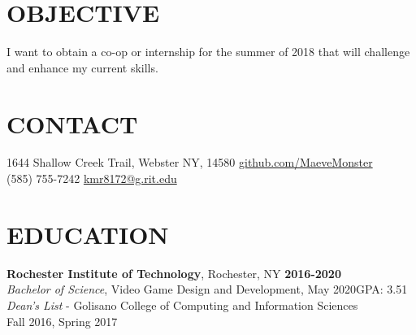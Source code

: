 \documentclass[line,margin]{res}
\begin{document}

\begin{resume}

\section{OBJECTIVE}
I want to obtain a co-op or internship for the summer of 2018 that will challenge 
and enhance my current skills.

\section{CONTACT}
1644 Shallow Creek Trail, Webster NY, 14580 \hfill \href{https://github.com/MaeveMonster}{github.com/MaeveMonster}\\(585) 755-7242 \hfill \href{mailto:kmr8172@g.rit.edu}{kmr8172@g.rit.edu}


\section{EDUCATION}
\textbf{Rochester Institute of Technology}, Rochester, NY\hfill
    \textbf{2016-2020}\\
{\sl Bachelor of Science}, Video Game Design and Development, May 2020\hfill GPA: 3.51
\\
{\sl Dean's List} - Golisano College of Computing and Information Sciences\hfill \\ Fall 2016, Spring 2017


\end{resume}
\end{document}
